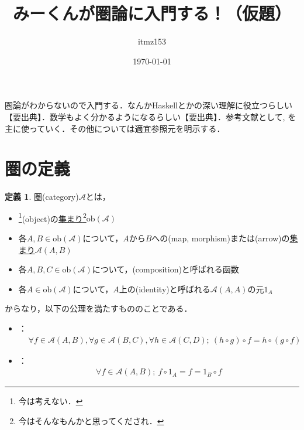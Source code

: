 \documentclass[dvipdfmx,12pt]{jsarticle}
\title{みーくんが圏論に入門する！（仮題）}
\date{\today}
\author{itmz153}
\theoremstyle{definition}
\newtheorem{definition}[theorem]{定義}
\begin{document}
\maketitle
%
圏論がわからないので入門する．なんかHaskellとかの深い理解に役立つらしい【要出典】．数学もよく分かるようになるらしい【要出典】．参考文献として\cite{001}, \cite{002}を主に使っていく．その他については適宜参照元を明示する．
%
\section{圏の定義}
%
\begin{definition}
圏(category)$\mathcal{A}$とは，
\begin{itemize}
  \item {}\footnote{今は考えない．}(object)の\underline{集まり}\footnote{今はそんなもんかと思ってくだされ．}$\mathrm{ob}(\mathcal{A})$
  \item 各$A,B \in \mathrm{ob}(\mathcal{A})$について，$A$から$B$への(map, morphism)または(arrow)の\underline{集まり}$\mathcal{A}(A,B)$
  \item 各$A,B,C \in \mathrm{ob}(\mathcal{A})$について，(composition)と呼ばれる函数
\end{itemize}
%
\begin{center}
\end{center}
%
\begin{itemize}
  \item 各$A \in \mathrm{ob}(\mathcal{A})$について，$A$上の(identity)と呼ばれる$\mathcal{A}(A, A)$の元$1_{A}$
\end{itemize}
からなり，以下の公理を満たすもののことである．
%
\begin{itemize}
	\item {}：
		\begin{align*}
			&\forall f \in \mathcal{A}(A,B), \forall g \in \mathcal{A}(B,C), \forall h \in \mathcal{A}(C,D);\ (h \circ g) \circ f = h \circ (g \circ f)
		\end{align*}
	\item {}：
		\begin{align*}
			\forall f \in \mathcal{A}(A,B);\ f \circ 1_{A} = f = 1_{B} \circ f
		\end{align*}
\end{itemize}
\end{definition}
\end{document}
